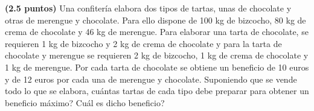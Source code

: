 
\textbf{(2.5 puntos)} Una confitería elabora dos tipos de tartas, unas de
chocolate y otras de merengue y chocolate. Para ello dispone de 100 kg de
bizcocho, 80 kg de crema de chocolate y 46 kg de merengue. Para elaborar
una tarta de chocolate, se requieren 1 kg de bizcocho y 2 kg de crema de
chocolate y para la tarta de chocolate y merengue se requieren 2 kg de
bizcocho, 1 kg de crema de chocolate y 1 kg de merengue. Por cada tarta
de chocolate se obtiene un beneficio de 10 euros y de 12 euros por cada
una de merengue y chocolate. Suponiendo que se vende todo lo que se elabora,
\textquestiondown{}cuántas tartas de cada tipo debe preparar para obtener
un beneficio máximo? \textquestiondown{}Cuál es dicho beneficio?
